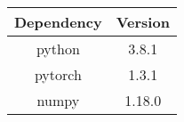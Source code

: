 \documentclass{article}
\begin{document}
  \begin{tabular}{|c | c|}
    \hline
    Dependency & Version \\
    \hline
    python  & 3.8.1 \\
    pytorch & 1.3.1 \\
    numpy   & 1.18.0 \\
    \hline
  \end{tabular}
\end{document}
